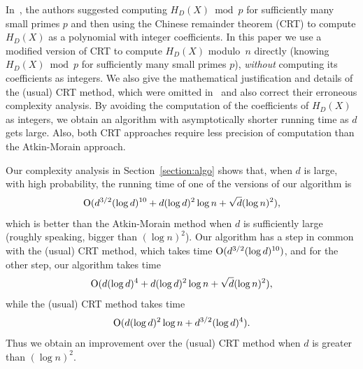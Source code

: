 \documentclass{amsart}
\newcommand{\bigo}{{\rm O}}
\theoremstyle{plain}
\begin{document}
In~\cite[\S4]{cnst}, the authors suggested computing $H_D(X) \bmod p$ 
for sufficiently many small primes $p$ and then using
the Chinese remainder theorem (CRT) to compute $H_D(X)$ as a polynomial with 
integer coefficients.  
In this paper we use a modified version of CRT 
to compute $H_D(X)$ modulo~$n$ directly (knowing
$H_D(X) \bmod p$ for sufficiently many small primes $p$),
{\it without} computing its coefficients as integers.
We also give the mathematical justification and details of
the (usual) CRT method, which were omitted
in~\cite[\S4]{cnst} and also correct their erroneous complexity analysis.
By avoiding the computation of the coefficients of $H_D(X)$ as integers,
we obtain an algorithm 
with asymptotically shorter running time as $d$ gets large.
Also, both CRT approaches require less precision of computation than the Atkin-Morain approach. 

Our complexity analysis in Section~\ref{section:algo} shows that,
when $d$ is large, with high probability, 
the running time of one of the versions of our algorithm is
$$\bigo(d^{3/2} (\log d)^{10} + d (\log d)^2 \log n + \sqrt{d} (\log n)^2 ),$$
which is better than the Atkin-Morain method
when $d$ is sufficiently large (roughly speaking, bigger than
$(\log n)^2$). Our algorithm has a step in common
with the (usual) CRT method, which takes time $\bigo(d^{3/2} (\log d)^{10})$,
and for the other step, our algorithm takes time
$$\bigo(d (\log d)^4  + d (\log d)^2 \log n + \sqrt{d} (\log n)^2 ),$$ 
while the (usual) CRT method takes time 
$$\bigo( d (\log d)^2 \log n + d^{3/2} (\log d)^4  ).$$
Thus we obtain an improvement over the (usual) CRT  method when $d$ is 
greater than $(\log n)^2$.
\end{document}
